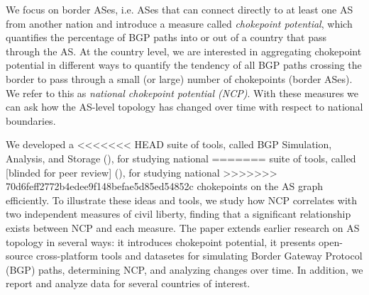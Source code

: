 We focus on border ASes, i.e. ASes that can connect directly to at least
one AS from another nation and introduce a measure called \emph{chokepoint potential}, which quantifies the percentage of BGP paths into or out of a country that pass through the AS.  At the country level, we are interested in aggregating chokepoint potential in different ways to quantify the tendency of all BGP paths crossing the border to pass through a small (or large) number of chokepoints (border ASes). We  refer to this as \emph{national chokepoint potential (NCP)}.
With these measures 
we can ask how the AS-level topology has changed over time with respect
to national boundaries. 

We developed a
<<<<<<< HEAD
suite of tools, called BGP Simulation, Analysis, and Storage (\toolname{}), for studying national 
=======
suite of tools, called [blinded for peer review] (\toolname{}), for studying national 
>>>>>>> 70d6feff2772b4edee9f148befae5d85ed54852c
chokepoints on
the AS graph efficiently. To illustrate these ideas and tools, we
study how NCP correlates with two independent
measures of civil liberty, finding that a significant relationship exists between NCP and each measure.
The paper extends earlier research on AS topology in several ways: it introduces chokepoint potential, it presents open-source cross-platform tools and datasetes for simulating Border Gateway Protocol (BGP) paths,
determining NCP, and analyzing changes over time.  In addition, we report and analyze data for several countries of interest.


